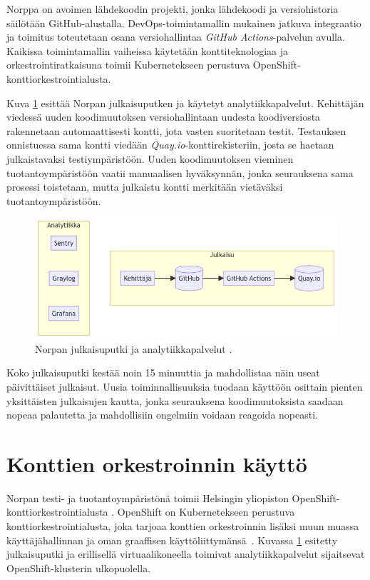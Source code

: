 Norppa on avoimen lähdekoodin projekti, jonka lähdekoodi ja versiohistoria säilötään GitHub-alustalla.
DevOps-toimintamallin mukainen jatkuva integraatio ja toimitus toteutetaan osana versiohallintaa \textit{GitHub Actions}-palvelun avulla.
Kaikissa toimintamallin vaiheissa käytetään konttiteknologiaa ja orkestrointiratkaisuna toimii Kubernetekseen perustuva OpenShift-konttiorkestrointialusta.

Kuva \ref{fig:norppa:deployment} esittää Norpan julkaisuputken ja käytetyt analytiikkapalvelut.
Kehittäjän viedessä uuden koodimuutoksen versiohallintaan uudesta koodiversiosta rakennetaan automaattisesti kontti, jota vasten suoritetaan testit.
Testauksen onnistuessa sama kontti viedään \textit{Quay.io}-konttirekisteriin, josta se haetaan julkaistavaksi testiympäristöön.
Uuden koodimuutoksen vieminen tuotantoympäristöön vaatii manuaalisen hyväksynnän, jonka seurauksena sama prosessi toistetaan, mutta julkaistu kontti merkitään vietäväksi tuotantoympäristöön.

\begin{figure}[ht]
\begin{center}
\includegraphics[width=1\textwidth]{figures/norppa_deployment.png}
\caption{Norpan julkaisuputki ja analytiikkapalvelut \cite{Norppa23}\label{fig:norppa:deployment}.}
\end{center}
\end{figure}

Koko julkaisuputki kestää noin 15 minuuttia ja mahdollistaa näin useat päivittäiset julkaisut.
Uusia toiminnallisuuksia tuodaan käyttöön osittain pienten yksittäisten julkaisujen kautta, jonka seurauksena koodimuutoksista saadaan nopeaa palautetta ja mahdollisiin ongelmiin voidaan reagoida nopeasti.

\section{Konttien orkestroinnin käyttö}

Norpan testi- ja tuotantoympäristönä toimii Helsingin yliopiston OpenShift-konttiorkes\-trointialusta \cite{Helsinki21}.
OpenShift on Kubernetekseen perustuva konttiorkestrointialusta, joka tarjoaa konttien orkestroinnin lisäksi muun muassa käyttäjähallinnan ja oman graaffisen käyttöliittymänsä~\cite{Lossent17}.
Kuvassa \ref{fig:norppa:deployment} esitetty julkaisuputki ja erillisellä virtuaalikoneella toimivat analytiikkapalvelut sijaitsevat OpenShift-klusterin ulkopuolella.


